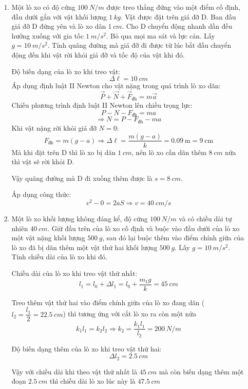 \begin{enumerate}[label=\bfseries Câu \arabic*:]
	\item {}
	
	
	{
		Một lò xo có độ cứng $\SI{100}{N/m}$ được treo thẳng đứng vào một điểm cố định, đầu dưới gắn với vật khối lượng $\SI{1}{kg}$. Vật được đặt trên giá đỡ D. Ban đầu giá đỡ D đứng yên và lò xo dãn $\SI{1}{cm}$. Cho D chuyển động nhanh dần đều hướng xuống với gia tốc $\SI{1}{m/s^2}$. Bỏ qua mọi ma sát và lực cản. Lấy $g=\SI{10}{m/s^2}$. Tính quãng đường mà giá đỡ đi được từ lúc bắt đầu chuyển động đến khi vật rời khỏi giá đỡ và tốc độ của vật khi đó.
	}
	
	\hideall
	{	
		Độ biến dạng của lò xo khi treo vật:
		$$\Delta \ell = \SI{10}{cm}$$
		Áp dụng định luật II Newton cho vật nặng trong quá trình lò xo dãn:
		$$\vec P+\vec N+\vec F_\text{đh}=m\vec a$$
		Chiếu phương trình định luật II Newton lên chiều trọng lực:
		$$P-N-F_\text{đh}=ma$$
		$$\Rightarrow N=P-F_\text{đh}-ma$$
		Khi vật nặng rời khỏi giá đỡ $N=0$:
		$$F_\text{đh}=m\left(g-a\right)\Rightarrow \Delta\ell=\dfrac{m\left(g-a\right)}{k}=\SI{0.09}{\meter}=\SI{9}{\centi\meter}$$
		Mà khi đặt trên D thì lò xo bị dãn $\SI{1}{cm}$, nên lò xo cần dãn thêm $\SI{8}{cm}$ nữa thì vật sẽ rời khỏi D.
		
		Vậy quãng đường mà D đi xuống thêm được là $s=\SI{8}{cm}$.
		
		Áp dụng công thức:
		$$v^2 -0 = 2aS \Rightarrow v = \SI{40}{cm/s}$$
	}

\item {}


{
	Một lò xo khối lượng không đáng kể, độ cứng $\SI{100}{N/m}$ và có chiều dài tự nhiên $\SI{40}{cm}$. Giữ đầu trên của lò xo cố định và buộc vào đầu dưới của lò xo một vật nặng khối lượng $\SI{500}{g}$, sau đó lại buộc thêm vào điểm chính giữa của lò xo đã bị dãn thêm một vật thứ hai khối lượng $\SI{500}{g}$. Lấy $g=\SI{10}{m/s^2}$. Tính chiều dài của lò xo khi đó.
}

\hideall
{	
	Chiều dài của lò xo khi treo vật thứ nhất:
	$$l_1 = l_0 + \Delta l_1 = l_0 + \dfrac{m_1g}{k} = \SI{45}{cm}$$
	
	Treo thêm vật thứ hai vào điểm chính giữa của lò xo đang dãn ($l_2 = \dfrac{l_1}{2} = \SI{22.5}{cm}$) thì tương ứng với cắt lò xo ra còn một nửa 
	$$k_1l_1= k_2 l_2 \Rightarrow k_2 = \dfrac{k_1l_1}{l_2} = \SI{200}{N/m}$$
	
	Độ biến dạng thêm của lò xo khi treo vật thứ hai:
	$$\Delta l_2 = \SI{2.5}{cm}$$
	
	Vậy với chiều dài khi theo vật thứ nhất là $\SI{45}{cm}$ mà còn biến dạng thêm một đoạn $\SI{2.5}{cm}$ thì chiều dài lò xo lúc này là $\SI{47.5}{cm}$
	
}
	
\end{enumerate}